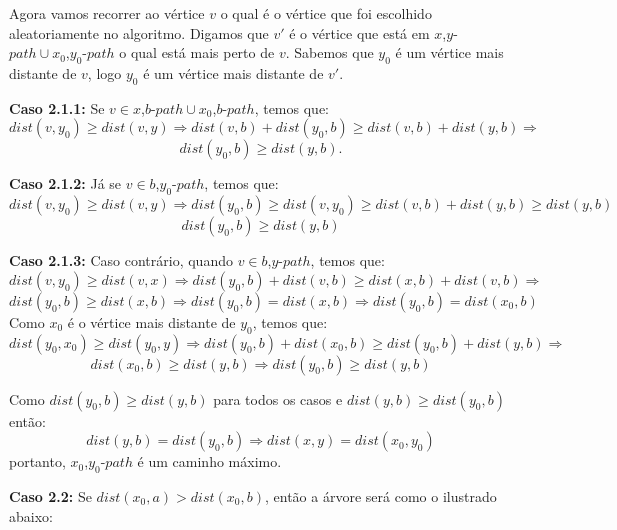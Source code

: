 \documentclass[a4paper,12pt]{article}
\begin{document}
\begin{itemize}
		Agora vamos recorrer ao vértice $v$ o qual é o vértice
		que foi escolhido aleatoriamente no algoritmo.
		Digamos que $v'$ é o vértice que está em
		$x$,$y$-$path\cup x_0$,$y_0$-$path$ o qual está mais
		perto de $v$.
		Sabemos que $y_0$ é um vértice mais distante de $v$,
		logo $y_0$ é um vértice mais distante de $v'$. 
		
		\textbf{Caso 2.1.1:} Se 
		$v\in x$,$b$-$path\cup x_0$,$b$-$path$, temos que:
		$$ dist(v,y_0)\ge dist(v,y) \Rightarrow
		dist(v,b)+dist(y_0,b)\ge dist(v,b) + dist(y,b) 
		\Rightarrow$$
		$$ dist(y_0,b)\ge dist(y,b).$$

		\textbf{Caso 2.1.2:} Já se $v\in b$,$y_0$-$path$, 
		temos que:
		$$ dist(v,y_0)\ge dist(v,y) \Rightarrow
		dist(y_0,b)\ge dist(v,y_0)\ge 
		dist(v,b) + dist(y,b)\ge dist(y,b) $$
		$$ dist(y_0,b)\ge dist(y,b) $$

		\textbf{Caso 2.1.3:} Caso contrário, quando 
		$v\in b$,$y$-$path$, temos que:
		$$ dist(v,y_0)\ge dist(v,x) \Rightarrow
		dist(y_0,b)+dist(v,b)\ge dist(x,b)+dist(v,b)
		\Rightarrow $$
		$$ dist(y_0,b)\ge dist(x,b) \Rightarrow
		dist(y_0,b) = dist(x,b) \Rightarrow 
		dist(y_0,b) = dist(x_0,b) $$
		Como  $x_0$ é o vértice mais distante de $y_0$, temos
		que:
		$$ dist(y_0,x_0)\ge dist(y_0,y) \Rightarrow
		dist(y_0,b) + dist(x_0,b)\ge dist(y_0,b) + dist(y,b)
		\Rightarrow $$
		$$ dist(x_0,b)\ge dist(y,b) \Rightarrow 
		dist(y_0,b)\ge dist(y,b) $$

		\bigskip

		Como $dist(y_0,b)\ge dist(y,b)$ para todos os casos
		e $dist(y,b)\ge dist(y_0,b)$ então:
		$$ dist(y,b) =  dist(y_0,b) \Rightarrow
		dist(x,y) = dist(x_0,y_0) $$
		portanto, $x_0$,$y_0$-$path$ é um caminho máximo.

		\bigskip
		\bigskip

		\textbf{Caso 2.2:} Se $dist(x_0,a)> dist(x_0,b)$,
		então a árvore será como o ilustrado abaixo:



\end{itemize}
\end{document}
